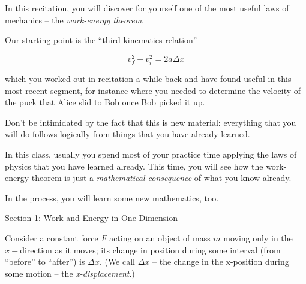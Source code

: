 \documentclass[12pt]{article}
\begin{document}
\Large
\centerline{}

\normalsize
\centerline{}

In this recitation, you will discover for yourself one of the most useful laws of mechanics -- the {\it work-energy theorem}.

Our starting point is the ``third kinematics relation''

$$ v_f^2 - v_i^2 = 2 a \Delta x$$

which you worked out in recitation a while back and have found useful in this most recent segment, for instance where you needed to determine the velocity of the puck that Alice slid to Bob once Bob picked it up.

Don't be intimidated by the fact that this is new material: everything that you will do follows logically from things that you have already learned.

In this class, usually you spend most of your practice time applying the laws of physics that you have learned already. This time, you will see how the work-energy theorem is just a {\it mathematical consequence} of what you know already. 

In the process, you will learn some new mathematics, too.


\newpage

{\Large Section 1: Work and Energy in One Dimension}

Consider a constant force $F$ acting on an object of mass $m$ moving only in the $x-$direction as it moves; its change in position during some interval (from ``before'' to ``after'') is $\Delta x$. (We call $\Delta x$ -- the change in the x-position during some 
motion -- the {\it x-displacement}.)
\end{document}
